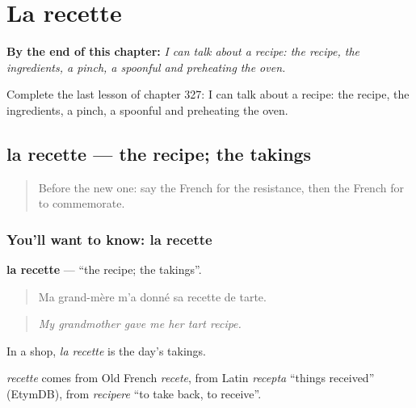 
\chapter{La recette}
\label{ch:fr-la-recette}

\begin{chapteropening}
\textbf{By the end of this chapter:} \emph{I can talk about a recipe: the recipe, the ingredients, a pinch, a spoonful and preheating the oven.}

Complete the last lesson of chapter 327: I can talk about a recipe: the recipe, the ingredients, a pinch, a spoonful and preheating the oven.
\end{chapteropening}

\section[la recette]{la recette — the recipe; the takings}

\label{lesson:FR-C327-recette}



\begin{quote}
Before the new one: say the French for the resistance, then the French for to commemorate.
\end{quote}

\subsection*{You'll want to know: la recette}
\textbf{la recette} — \textquotedblleft{}the recipe; the takings\textquotedblright{}.

\begin{quote}
Ma grand-mère m'a donné sa recette de tarte.
\end{quote}

\begin{quote}
\emph{My grandmother gave me her tart recipe.}
\end{quote}

In a shop, \emph{la recette} is the day's takings.

\begin{cousinweb}
\emph{recette} comes from Old French \emph{recete}, from Latin \emph{recepta} \textquotedblleft{}things received\textquotedblright{} (EtymDB), from \emph{recipere} \textquotedblleft{}to take back, to receive\textquotedblright{}.
\end{cousinweb}

